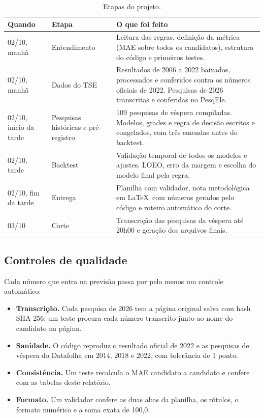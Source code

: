 \documentclass[10.5pt,a4paper]{article}
\begin{document}
\begin{table}[h]
\centering\small
\caption{Etapas do projeto.}
\begin{tabularx}{\linewidth}{@{}lp{3.3cm}X@{}}
\toprule
Quando & Etapa & O que foi feito \\
\midrule
02/10, manhã & Entendimento & Leitura das regras, definição da métrica (MAE sobre todos os candidatos), estrutura do código e primeiros testes. \\
02/10, manhã & Dados do TSE & Resultados de 2006 a 2022 baixados, processados e conferidos contra os números oficiais de 2022. Pesquisas de 2026 transcritas e conferidas no PesqEle. \\
02/10, início da tarde & Pesquisas históricas e pré-registro & 109 pesquisas de véspera compiladas. Modelos, grades e regra de decisão escritos e congelados, com três emendas antes do backtest. \\
02/10, tarde & Backtest & Validação temporal de todos os modelos e ajustes, LOEO, erro da margem e escolha do modelo final pela regra. \\
02/10, fim da tarde & Entrega & Planilha com validador, nota metodológica em \LaTeX\ com números gerados pelo código e roteiro automático do corte. \\
03/10 & Corte & Transcrição das pesquisas da véspera até 20h00 e geração dos arquivos finais. \\
\bottomrule
\end{tabularx}
\end{table}

\subsection{Controles de qualidade}
Cada número que entra na previsão passa por pelo menos um controle automático:
\begin{itemize}
\item \textbf{Transcrição.} Cada pesquisa de 2026 tem a página original salva com hash SHA-256; um teste procura cada número transcrito junto ao nome do candidato na página.
\item \textbf{Sanidade.} O código reproduz o resultado oficial de 2022 e as pesquisas de véspera do Datafolha em 2014, 2018 e 2022, com tolerância de 1 ponto.
\item \textbf{Consistência.} Um teste recalcula o MAE candidato a candidato e confere com as tabelas deste relatório.
\item \textbf{Formato.} Um validador confere as duas abas da planilha, os rótulos, o formato numérico e a soma exata de 100,0.
\end{itemize}
\end{document}
